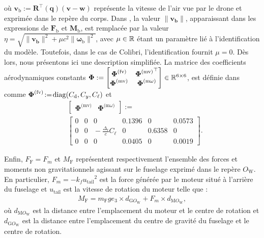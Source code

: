 où $\boldsymbol{v}_{\text{b}} := \boldsymbol{R}^\top(\boldsymbol{q}) (\boldsymbol{v}-\boldsymbol{w})$ représente la vitesse de l'air vue par le drone et exprimée dans le repère du corps. Dans \cite{lustosaHal-03035938}, la valeur $\lVert \boldsymbol{v_{\text{b}}} \rVert$, apparaissant dans les expressions de  $\boldsymbol{F}_{\text{b}}$ et $\boldsymbol{M}_{\text{b}}$, est remplacée par la valeur $\eta = \sqrt{\lVert \boldsymbol{v_{\text{b}}} \rVert^{2} + \mu c^{2} \lVert \boldsymbol{\omega}_{\text{b}} \rVert^{2}}$, avec $\mu \in {\mathbb R}$ étant un paramètre lié à l'identification du modèle. Toutefois, dans le cas de Colibri, l'identification fournit $\mu = 0$. 
Dès lors, nous présentons ici une description simplifiée. La matrice des coefficients aérodynamiques constants 
$\boldsymbol{\Phi}:= \begin{bmatrix} \boldsymbol{\Phi}^{\text{(fv)}} & {\boldsymbol{\Phi}^{\text{(mv)}}}^\top \\ \boldsymbol{\Phi}^{\text{(mv)}} & \boldsymbol{\Phi}^{\text{(m$\omega$)}} \end{bmatrix} \in {\mathbb R}^{6 \times 6}$, est définie dans \cite[eqs. (6)--(9)]{olszaneckibarthHal-02542982} comme $ \boldsymbol{\Phi}^{\text{(fv)}} \!:=\! \operatorname{diag}(C_{\text{d}},C_{y}, C_{\ell})$ et
\begin{align*}
&\left[ \begin{array}{c|c}
    \boldsymbol{\Phi}^{\text{(mv)}}  &  \boldsymbol{\Phi}^{\text{(m$\omega$)}} 
\end{array}\right] :=\\ 
&\left[ \begin{array}{ccc|ccc}
    0 & 0 & 0    &                                          0.1396 & 0 & 0.0573 \\
    0 & 0 & \!\!\!\!\! -\frac{\Delta_{\text{r}}}{c}C_{\ell} &    0 &  0.6358  & 0 \\
    0 & 0 & 0 &     0.0405 & 0 & 0.0019 
\end{array}\right].
\end{align*}




Enfin, $F_{\text{F}} = F_{m}$ et $M_{\text{F}}$ représentent respectivement l'ensemble des forces et moments non gravitationnels agissant sur le fuselage exprimé dans le repère $O_{\text{W}}$. En particulier, $F_{m} = - k_{f} {u_{\text{tail}}}^{2}$ est la force générée par le moteur situé à l'arrière du fuselage et $u_{\text{tail}}$ est la vitesse de rotation du moteur telle que :
\begin{align}
    M_{\text{F}} =  m_{\text{F}} g e_3 \times d_{\text{G}O_{\text{W}}} + F_{m} \times d_{\text{M}O_{\text{W}}},
\end{align}
où $d_{\text{M}O_{\text{W}}}$ est la distance entre l'emplacement du moteur et le centre de rotation et $d_{\text{G}O_{\text{W}}}$ est la distance entre l'emplacement du centre de gravité du fuselage et le centre de rotation.


